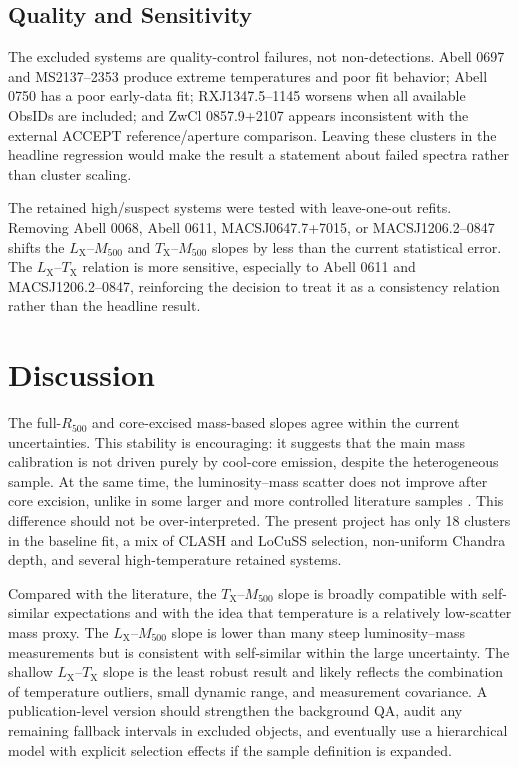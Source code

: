 \documentclass[11pt]{article}
\newcommand{\Mfive}{\ensuremath{M_{500}}}
\newcommand{\Rfive}{\ensuremath{R_{500}}}
\newcommand{\Lx}{\ensuremath{L_{\mathrm{X}}}}
\newcommand{\Tx}{\ensuremath{T_{\mathrm{X}}}}
\begin{document}
\subsection{Quality and Sensitivity}

The excluded systems are quality-control failures, not non-detections. Abell 0697 and MS2137--2353 produce extreme temperatures and poor fit behavior; Abell 0750 has a poor early-data fit; RXJ1347.5--1145 worsens when all available ObsIDs are included; and ZwCl 0857.9+2107 appears inconsistent with the external ACCEPT reference/aperture comparison. Leaving these clusters in the headline regression would make the result a statement about failed spectra rather than cluster scaling.

The retained high/suspect systems were tested with leave-one-out refits. Removing Abell 0068, Abell 0611, MACSJ0647.7+7015, or MACSJ1206.2--0847 shifts the \Lx--\Mfive{} and \Tx--\Mfive{} slopes by less than the current statistical error. The \Lx--\Tx{} relation is more sensitive, especially to Abell 0611 and MACSJ1206.2--0847, reinforcing the decision to treat it as a consistency relation rather than the headline result.

\section{Discussion}

The full-\Rfive{} and core-excised mass-based slopes agree within the current uncertainties. This stability is encouraging: it suggests that the main mass calibration is not driven purely by cool-core emission, despite the heterogeneous sample. At the same time, the luminosity--mass scatter does not improve after core excision, unlike in some larger and more controlled literature samples \citep{pratt2009,mantz2010,mantz2016}. This difference should not be over-interpreted. The present project has only 18 clusters in the baseline fit, a mix of CLASH and LoCuSS selection, non-uniform Chandra depth, and several high-temperature retained systems.

Compared with the literature, the \Tx--\Mfive{} slope is broadly compatible with self-similar expectations and with the idea that temperature is a relatively low-scatter mass proxy. The \Lx--\Mfive{} slope is lower than many steep luminosity--mass measurements but is consistent with self-similar within the large uncertainty. The shallow \Lx--\Tx{} slope is the least robust result and likely reflects the combination of temperature outliers, small dynamic range, and measurement covariance. A publication-level version should strengthen the background QA, audit any remaining fallback intervals in excluded objects, and eventually use a hierarchical model with explicit selection effects if the sample definition is expanded.
\end{document}
